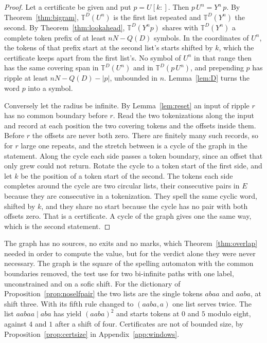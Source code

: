\documentclass[11pt,a4paper]{article}
\theoremstyle{definition}
\theoremstyle{plain}
\newcommand{\T}{\mathbb{T}}
\begin{document}
\begin{proof}
Let a certificate be given and put \(p = U[k{:}]\). Then \(p\,U^n = Y^n\,p\). By Theorem~\ref{thm:bigram}, \(\T^D(U^n)\)
is the first list repeated and \(\T^D(Y^n)\) the second. By Theorem~\ref{thm:lookahead}, \(\T^D(Y^n p)\) shares with
\(\T^D(Y^n)\) a complete token prefix of at least \(nN - Q(D)\) symbols. In the coordinates of \(U^n\), the tokens of
that prefix start at the second list's starts shifted by \(k\), which the certificate keeps apart from the first list's.
No symbol of \(U^n\) in that range then has the same covering span in \(\T^D(U^n)\) and in \(\T^D(p\,U^n)\), and
prepending \(p\) has ripple at least \(nN - Q(D) - |p|\), unbounded in \(n\). Lemma~\ref{lem:D} turns the word \(p\)
into a symbol.

Conversely let the radius be infinite. By Lemma~\ref{lem:reset} an input of ripple \(r\) has no common boundary before
\(r\). Read the two tokenizations along the input and record at each position the two covering tokens and the offsets
inside them. Before \(r\) the offsets are never both zero. There are finitely many such records, so for \(r\) large one
repeats, and the stretch between is a cycle of the graph in the statement. Along the cycle each side passes a token
boundary, since an offset that only grew could not return. Rotate the cycle to a token start of the first side, and let
\(k\) be the position of a token start of the second. The tokens each side completes around the cycle are two circular
lists, their consecutive pairs in \(E\) because they are consecutive in a tokenization. They spell the same cyclic word,
shifted by \(k\), and they share no start because the cycle has no pair with both offsets zero. That is a certificate. A
cycle of the graph gives one the same way, which is the second statement.
\end{proof}

The graph has no sources, no exits and no marks, which Theorem~\ref{thm:overlap} needed in order to compute the value,
but for the verdict alone they were never necessary. The graph is the square of the spelling automaton with the common
boundaries removed, the test \citet[Propositions~3 and~14]{beal2024unambiguously} use for two bi-infinite paths with one
label, unconstrained and on a sofic shift. For the dictionary of Proposition~\ref{prop:noselfpair} the two lists are the
single tokens \(abaa\) and \(aaba\), at shift three. With its fifth rule changed to \((aaba, a)\) one list serves twice.
The list \(aabaa \mid aba\) has yield \((aaba)^2\) and starts tokens at \(0\) and \(5\) modulo eight, against \(4\) and
\(1\) after a shift of four. Certificates are not of bounded size, by Proposition~\ref{prop:certsize} in
Appendix~\ref{app:windows}.
\end{document}
